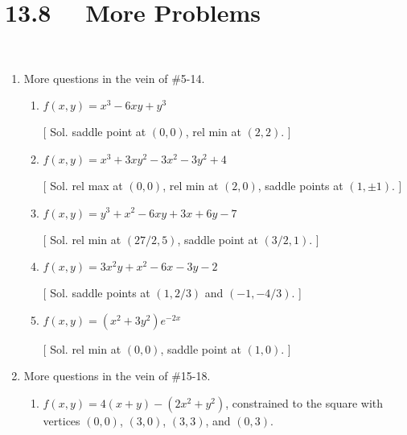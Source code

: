 

\section*{13.8 \ \ More Problems}

\ 


\begin{enumerate}
\item  More questions in the vein of \#5-14.

\begin{enumerate}
\item  $f(x, y) = x^3 - 6xy + y^3$

[ Sol.  saddle point at $(0, 0)$, rel min at $(2, 2)$. ]  \\

\item  $f(x, y) = x^3 + 3xy^2 - 3x^2 - 3y^2 + 4$

[ Sol.  rel max at $(0,0)$, rel min at $(2, 0)$, saddle points at $(1, \pm 1)$. ] \\

\item  $f(x, y) = y^3 + x^2 - 6xy + 3x + 6y - 7$

[ Sol.  rel min at $(27/2, 5)$, saddle point at $(3/2, 1)$. ]  \\

\item  $f(x, y) = 3x^2 y + x^2 - 6x - 3y - 2$

[ Sol.  saddle points at $(1, 2/3)$ and $(-1, -4/3)$. ]  \\

\item  $f(x, y) = (x^2 + 3y^2) e^{-2x}$

[ Sol.  rel min at $(0, 0)$, saddle point at $(1,0)$. ] \\

\end{enumerate}

\item  More questions in the vein of \#15-18.

\begin{enumerate}
\item  $f(x, y) = 4(x + y) - (2x^2 + y^2)$, constrained to the square with vertices $(0, 0)$, $(3, 0)$, $(3, 3)$, and $(0, 3)$.  


\end{enumerate}
\end{enumerate}
